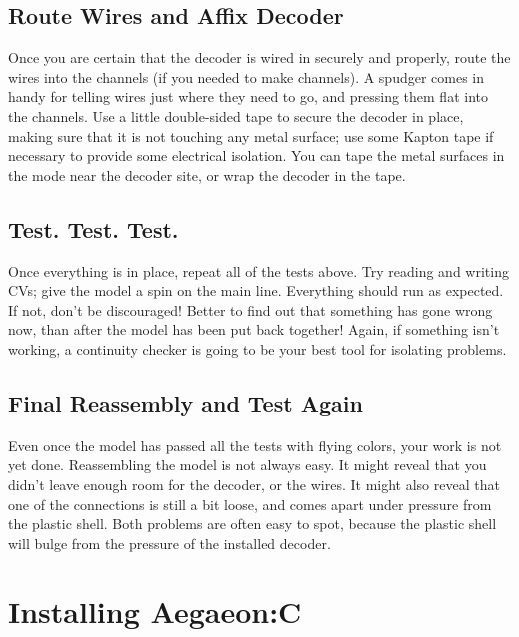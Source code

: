 \documentclass[12pt,letterpaper,draft]{memoir} %
\begin{document}
\subsection{Route Wires and Affix Decoder}

Once you are certain that the decoder is wired in securely and properly, route the wires into the channels (if you needed to make channels). A spudger comes in handy for telling wires just where they need to go, and pressing them flat into the channels. Use a little double-sided tape to secure the decoder in place, making sure that it is not touching any metal surface; use some Kapton tape if necessary to provide some electrical isolation. You can tape the metal surfaces in the mode near the decoder site, or wrap the decoder in the tape.

\subsection {Test. Test. Test.}

Once everything is in place, repeat all of the tests above. Try reading and writing CVs; give the model a spin on the main line. Everything should run as expected. If not, don't be discouraged! Better to find out that something has gone wrong now, than after the model has been put back together! Again, if something isn't working, a continuity checker is going to be your best tool for isolating problems.

\subsection{Final Reassembly and Test Again}

Even once the model has passed all the tests with flying colors, your work is not yet done. Reassembling the model is not always easy. It might reveal that you didn't leave enough room for the decoder, or the wires. It might also reveal that one of the connections is still a bit loose, and comes apart under pressure from the plastic shell. Both problems are often easy to spot, because the plastic shell will bulge from the pressure of the installed decoder.

\section{Installing Aegaeon:C}
\end{document}
